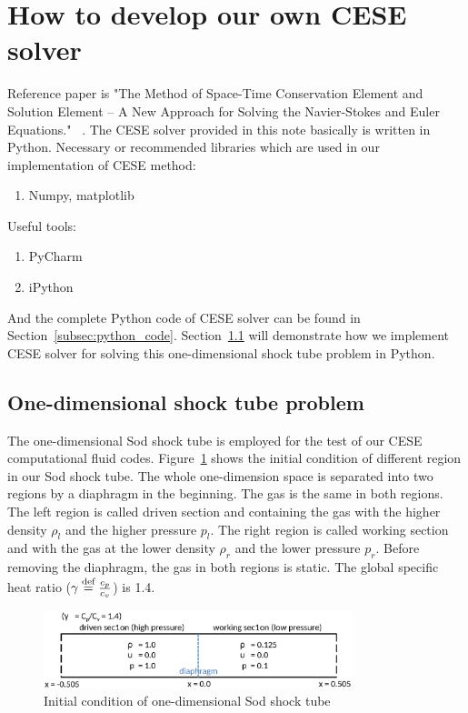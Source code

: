 \documentclass[a4paper,12pt,dvips]{article}
\begin{document}
\section{How to develop our own CESE solver}
 \label{sec:development_cese}
Reference paper is "The Method of Space-Time Conservation Element and Solution 
Element -- A New Approach for Solving the Navier-Stokes and Euler Equations."
~\cite{CESE_Shin_Chung_Chang_1995}. The CESE solver provided in this note 
basically is written in Python.
Necessary or recommended libraries which are used in our implementation of CESE 
method: 
 \begin{enumerate}
  \item Numpy, matplotlib
 \end{enumerate}
Useful tools:
 \begin{enumerate}
  \item PyCharm
  \item iPython
 \end{enumerate}
And the complete Python code of CESE solver can be found in 
Section~\ref{subsec:python_code}. Section~\ref{sec:1d_shock_tube} will 
demonstrate how we implement CESE solver for solving this one-dimensional 
shock tube problem in Python.

\subsection{One-dimensional shock tube problem}
 \label{sec:1d_shock_tube}
The one-dimensional Sod shock tube is employed for the test of our CESE 
computational fluid codes. Figure~\ref{fig:sod_shock_tube_1D} shows the 
initial condition of different region in our Sod shock tube. The whole 
one-dimension space is separated into two regions by a diaphragm in the 
beginning. The gas is the same in both regions. The left region is called 
driven section and containing the gas with the higher density $\rho_l$ and 
the higher pressure $p_l$. The right region is called working section and 
with the gas at the lower density $\rho_r$ and the lower pressure $p_r$. 
Before removing the diaphragm, the gas in both regions is static. The global 
specific heat ratio ($\gamma\buildrel{\text{def}}\over{=}\frac{c_p}{c_v}$) 
is 1.4.

 \begin{figure}[hbtp]
    \centering
     \includegraphics[width=0.8\textwidth]{sod_shock_tube_1D.eps}
     \caption{Initial condition of one-dimensional Sod shock tube}
     \label{fig:sod_shock_tube_1D}
 \end{figure}
\end{document}
